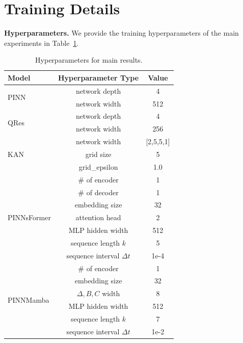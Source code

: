 \documentclass{article}
\theoremstyle{plain}
\theoremstyle{definition}
\theoremstyle{remark}
\begin{document}
\section{Training Details}
\label{apx:hyperparam}

\textbf{Hyperparameters.} We provide the training hyperparameters of the main experiments in Table~\ref{tab:hyperpara}.


\begin{table}[H]
\vspace{-3mm}
  \caption{Hyperparameters for main results.}
  
  \centering
    \small
  \begin{tabular}{l|c|c}

    \toprule 
    Model & Hyperparameter Type & Value\\
    \midrule
   \multirow{ 2}{*}{PINN} & network depth & 4\\
   & network width & 512 \\
    \midrule
   \multirow{ 2}{*}{QRes}& network depth & 4 \\
    & network width & 256 \\
    \midrule
    \multirow{ 3}{*}{KAN}   & network width  & [2,5,5,1] \\
     & grid size & 5\\
       & grid\_epsilon  & 1.0 \\
       \midrule
        \multirow{ 7}{*}{PINNsFormer}   & \# of encoder  & 1 \\
     & \# of decoder & 1\\
       & embedding size  & 32 \\
        & attention head  & 2 \\
                & MLP hidden width  & 512 \\
            & sequence length $k$  & 5 \\
            & sequence interval $\Delta t$  & 1e-4 \\
            \midrule
            \multirow{ 7}{*}{PINNMamba}   & \# of encoder  & 1 \\
       & embedding size  & 32 \\
        & $\Delta,B,C$ width & 8 \\
                & MLP hidden width  & 512 \\
            & sequence length $k$  & 7 \\
            & sequence interval $\Delta t$  & 1e-2 \\
                
       

    \bottomrule
  \end{tabular}
  \normalsize
  \label{tab:hyperpara}

\end{table}
\end{document}
